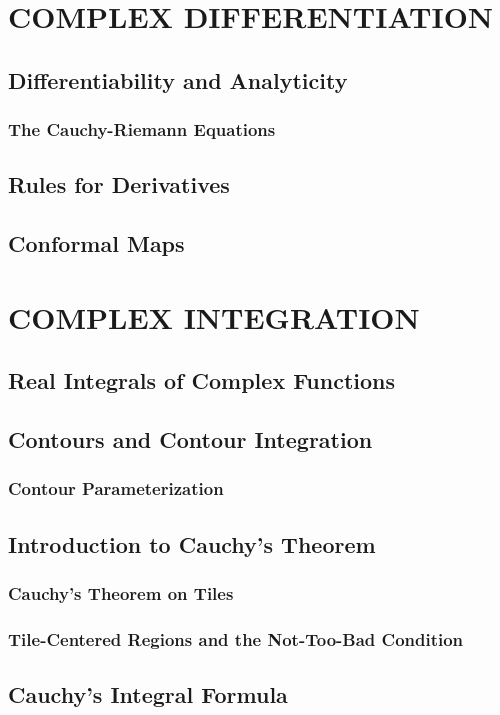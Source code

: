 \documentclass{refbook}
\begin{document}
  \section{COMPLEX DIFFERENTIATION}
  \subsection{Differentiability and Analyticity}
  \subsubsection{The Cauchy-Riemann Equations}
  \subsection{Rules for Derivatives}
  \subsection{Conformal Maps}


  \section{COMPLEX INTEGRATION}
  \subsection{Real Integrals of Complex Functions}
  \subsection{Contours and Contour Integration}
  \subsubsection{Contour Parameterization}
  \subsection{Introduction to Cauchy's Theorem}
  \subsubsection{Cauchy's Theorem on Tiles}
  \subsubsection{Tile-Centered Regions and the Not-Too-Bad Condition}
  \subsection{Cauchy's Integral Formula}
\end{document}
